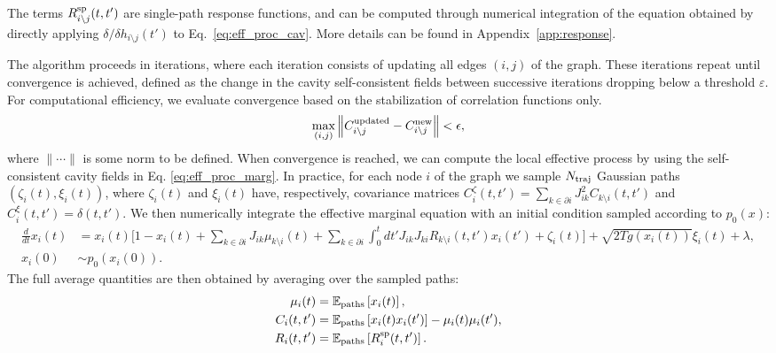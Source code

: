 \documentclass[
    preprint,
    linenumbers,
    amsmath,amssymb,amsfonts,
    aps, physrev,
    superscriptaddress,
    10pt,
    bibnotes
    ]{revtex4-2}
\begin{document}
The terms $R^{\rm sp}_{i\setminus j}(t,t')$ are single-path response functions, and can be computed through numerical integration of the equation obtained by directly applying $\delta / \delta h_{i\setminus j}(t')$ to Eq.~\eqref{eq:eff_proc_cav}. More details can be found in Appendix~\ref{app:response}.

The algorithm proceeds in iterations, where each iteration consists of updating all edges $
(i,j)$ of the graph. These iterations repeat until convergence is achieved, defined as the change in the cavity self-consistent fields between successive iterations dropping below a threshold $\varepsilon$. For computational efficiency, we evaluate convergence based on the stabilization of correlation functions only.
\begin{equation}
    \max_{(i,j)}\left\lVert C^{\rm updated}_{i\setminus j} - C_{i\setminus j}^{\rm new} \right\rVert < \epsilon,
\end{equation}
where $\lVert \cdots \rVert$ is some norm to be defined. When convergence is reached, we can compute the local effective process by using the self-consistent cavity fields in Eq. \eqref{eq:eff_proc_marg}. In practice, for each node $i$ of the graph we sample $N_{\rm traj}$ Gaussian paths $(\zeta_{i}(t), \xi_{i}(t))$, where $\zeta_{i}(t)$ and $\xi_{i}(t)$ have, respectively, covariance matrices $C^{\zeta}_{i}(t,t')=\sum_{k\in\partial i}J_{ik}^2C_{k\setminus i}(t,t')$ and $C^{\xi}_{i}(t,t')=\delta(t,t')$. We then numerically integrate the effective marginal equation with an initial condition sampled according to $p_0(x)$:
\begin{align*}
      \frac{d}{dt}x_{i}(t) & =x_{i}(t)\Biggl[1-x_{i}(t)+\sum_{k\in\partial i}J_{ik}\mu_{k\setminus i}(t) + \sum_{k\in\partial i}\int_{0}^{t}dt'J_{ik}J_{ki}R_{k\setminus i}(t,t')x_{i}(t')+\zeta_{i}(t)\Biggr]+\sqrt{2Tg(x_{i}(t))}\xi_{i}(t)+\lambda,\\
      x_{i}(0) & \sim p_0(x_{i}(0)). 
\end{align*}
The full average quantities are then obtained by averaging over the sampled paths:
\begin{align*}
    \mu_{i}(t) & = \mathbb{E}_{\rm paths}\left[x_{i}(t) \right],\\
    C_{i}(t,t') & = \mathbb{E}_{\rm paths}\left[x_{i}(t)x_{i}(t') \right] - \mu_{i}(t)\mu_{i}(t'),\\
    R_{i}(t,t') & = \mathbb{E}_{\rm paths}\left[R^{\rm sp}_{i}(t,t') \right].
\end{align*}
\end{document}
